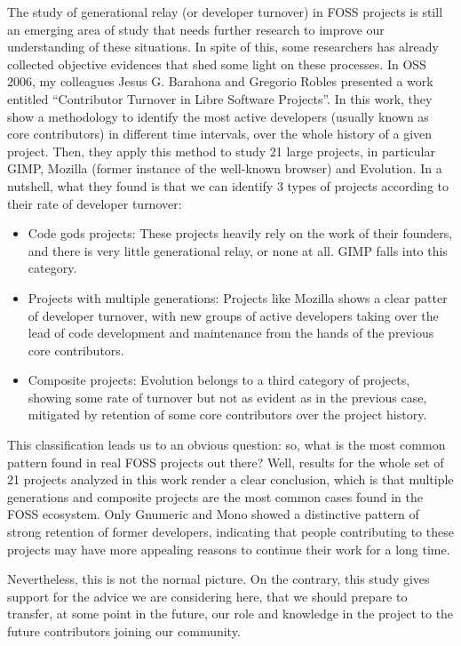The study of generational relay (or developer turnover) in FOSS projects is
still an emerging area of study that needs further research to improve our
understanding of these situations. In spite of this, some researchers has
already collected objective evidences that shed some light on these processes.
In OSS 2006, my colleagues Jesus G. Barahona and Gregorio Robles presented a
work entitled ``Contributor Turnover in Libre Software Projects''. In this work,
they show a methodology to identify the most active developers (usually known as
core contributors) in different time intervals, over the whole history of a
given  project. Then, they apply this method to study 21 large projects, in
particular GIMP, Mozilla (former instance of the well-known browser) and
Evolution. In a nutshell, what they found is that we can identify 3 types of
projects according to their rate of developer turnover:
\begin{itemize}
 \item Code gods projects: These projects heavily rely on the work of their
founders, and there is very little generational relay, or none at all. GIMP
falls into this category.
 \item Projects with multiple generations: Projects like Mozilla shows a clear
patter of developer turnover, with new groups of active developers taking over
the lead of code development and maintenance from the hands of the previous core
contributors.
 \item Composite projects: Evolution belongs to a third category of projects,
showing some rate of turnover but not as evident as in the previous case,
mitigated by retention of some core contributors over the project history.
\end{itemize}

This classification leads us to an obvious question: so, what is the most common
pattern found in real FOSS projects out there? Well, results for the whole set
of 21 projects analyzed in this work render a clear conclusion, which is that
multiple generations and composite projects are the most common cases found in
the FOSS ecosystem. Only Gnumeric and Mono showed a distinctive pattern of strong retention of former developers, indicating that people contributing to these projects may have more appealing reasons to continue their work for a long time.

Nevertheless, this is not the normal picture. On the contrary, this study gives
support for the advice we are considering here, that we should prepare to
transfer, at some point in the future, our role and knowledge in the project to
the future contributors joining our community.

